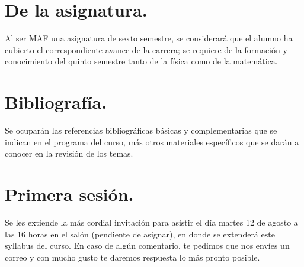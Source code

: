 \documentclass[14pt]{extarticle}
\numberwithin{equation}{section}
\begin{document}
\section{De la asignatura.}

Al ser MAF una asignatura de sexto semestre, se considerará que el alumno ha cubierto el correspondiente avance de la carrera; se requiere de la formación y conocimiento del quinto semestre tanto de la física como de la matemática.
 
\section{Bibliografía.}

Se ocuparán las referencias bibliográficas básicas y complementarias que se indican en el programa del curso, más otros materiales específicos que se darán a conocer en la revisión de los temas.

\section{Primera sesión.}

Se les extiende la más cordial invitación para asistir el día martes 12 de agosto a las 16 horas en el salón (pendiente de asignar), en donde se extenderá este syllabus del curso. En caso de algún comentario, te pedimos que nos envíes un correo y con mucho gusto te daremos respuesta lo más pronto posible.
\end{document}
